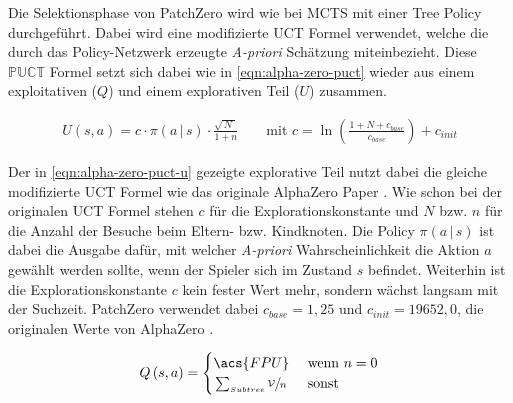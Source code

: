Die Selektionsphase von PatchZero wird wie bei \ac{MCTS} mit einer Tree Policy durchgeführt. Dabei wird eine modifizierte \ac{UCT} Formel verwendet, welche die durch das Policy-Netzwerk erzeugte \emph{A-priori} Schätzung miteinbezieht. Diese $\mathbb{PUCT}$ Formel setzt sich dabei wie in \ref{eqn:alpha-zero-puct} wieder aus einem exploitativen ($Q$) und einem explorativen Teil ($U$) zusammen.

\begin{align}
    \label{eqn:alpha-zero-puct-q}
    U\left(s,a\right) = c \cdot \pi\left(a\,|\,s\right) \cdot \frac{\sqrt{\,N\,\,}}{1 + n}\qquad \text{mit } c=\ln\left(\frac{1 + N + c_{base}}{c_{base}}\right) + c_{init}
\end{align}

Der in \ref{eqn:alpha-zero-puct-u} gezeigte explorative Teil nutzt dabei die gleiche modifizierte \ac{UCT} Formel wie das originale AlphaZero Paper \cite[Anhang, S. 2]{2017.AlphaGoZeroPaper}. Wie schon bei der originalen \ac{UCT} Formel stehen $c$ für die Explorationskonstante und $N$ bzw. $n$ für die Anzahl der Besuche beim Eltern- bzw. Kindknoten. Die Policy $\pi\left(a\,|\,s\right)$ ist dabei die Ausgabe dafür, mit welcher \emph{A-priori} Wahrscheinlichkeit die Aktion $a$ gewählt werden sollte, wenn der Spieler sich im Zustand $s$ befindet. Weiterhin ist die Explorationskonstante $c$ kein fester Wert mehr, sondern wächst langsam mit der Suchzeit. PatchZero verwendet dabei $c_{base} = 1{,}25$ und $c_{init} = 19652{,}0$, die originalen Werte von AlphaZero \cite[S. 17]{2018.AlphaZero}.

\begin{align}
    \label{eqn:alpha-zero-puct-u}
    Q\left(s,a\right) = \begin{cases}
        \acs{FPU}         & \text{ wenn } n = 0 \\
        \sfrac{\sum_{Subtree} \mathcal{V}}{n} & \text{ sonst }
    \end{cases}
\end{align}

